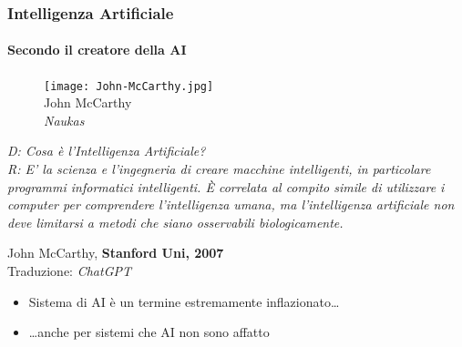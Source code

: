 %
\begin{frame}[t,fragile] \frametitle{Intelligenza Artificiale}
{\scriptsize
	\onslide<1->
		\framesubtitle{Secondo il creatore della AI}
		\vspace*{3pt}
		\begin{minipage}[t]{\textwidth}
			\begin{minipage}[t]{0.45\textwidth}
				\centering
				\begin{figure}[ht]
					\texttt{[image: John-McCarthy.jpg]}
					{\tiny\\John McCarthy\\\vspace*{-1pt}\textit{\textcopyright Naukas}}
				\end{figure}
			\end{minipage}
		    \begin{minipage}[t]{0.5\textwidth}
				\renewcommand{\epigraphsize}{\small}
				\setlength{\afterepigraphskip}{0pt}
				\setlength{\beforeepigraphskip}{5pt}
				\setlength{\epigraphwidth}{\textwidth}
				\epigraph{
					\textit{\alert{D:} Cosa è l'Intelligenza Artificiale?\\
					\alert{R:} E' la scienza e l'ingegneria di creare macchine intelligenti, in particolare programmi informatici intelligenti. È correlata al compito simile di utilizzare i computer per comprendere l'intelligenza umana, ma l'intelligenza artificiale non deve limitarsi a metodi che siano osservabili biologicamente.}}{John McCarthy, \textbf{Stanford Uni, 2007}\\Traduzione: \textit{\textcopyright ChatGPT}}
			\end{minipage}
		\end{minipage}
}
	\begin{itemize}[leftmargin=10pt,align=right]
		\item[\alert{\faHandORight}] Sistema di AI è un termine estremamente inflazionato\ldots 
		\onslide<3->\item[\alert{\faHandORight}] \ldots anche per sistemi che AI non sono affatto
	\end{itemize}
\end{frame}
%
